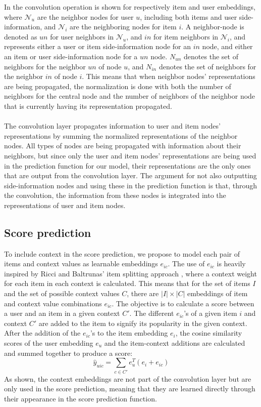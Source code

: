 In  the convolution operation is shown for respectively item and user embeddings, where $\mathcal{N}_{u}$ are the neighbor nodes for user $u$, including both items and user side-information, and $\mathcal{N}_{i}$ are the neighboring nodes for item $i$. 
A neighbor-node is denoted as $un$ for user neighbors in $\mathcal{N}_{u}$, and $in$ for item neighbors in $\mathcal{N}_{i}$, and represents either a user or item side-information node for an $in$ node, and either an item or user side-information node for a $un$ node.
$N_{un}$ denotes the set of neighbors for the neighbor $un$ of node $u$, and $N_{in}$ denotes the set of neighbors for the neighbor $in$ of node $i$.
This means that when neighbor nodes' representations are being propagated, the normalization is done with both the number of neighbors for the central node and the number of neighbors of the neighbor node that is currently having its representation propagated.
\\\\
The convolution layer propagates information to user and item nodes' representations by summing the normalized representations of the neighbor nodes.
All types of nodes are being propagated with information about their neighbors, but since only the user and item nodes' representations are being used in the prediction function for our model, their representations are the only ones that are output from the convolution layer.
The argument for not also outputting side-information nodes and using these in the prediction function is that, through the convolution, the information from these nodes is integrated into the representations of user and item nodes.

\subsection{Score prediction}\label{subsec:csgcn_is_score_prediction}
To include context in the score prediction, we propose to model each pair of items and context values as learnable embeddings $e_{ic}$.
The use of $e_{ic}$ is heavily inspired by Ricci and Baltrunas' item splitting approach \cite{baltrunasitemsplitting}, where a context weight for each item in each context is calculated.
This means that for the set of items $I$ and the set of possible context values $C$, there are $|I| \times |C|$ embeddings of item and context value combinations $e_{ic}$.
The objective is to calculate a score between a user and an item in a given context $C'$.
The different $e_{ic}$'s of a given item $i$ and context $C'$ are added to the item to signify its popularity in the given context.
After the addition of the $e_{ic}$'s to the item embedding $e_i$, the cosine similarity scores of the user embedding $e_u$ and the item-context additions are calculated and summed together to produce a score: 
\begin{equation}
  \hat{y}_{uic} = \sum_{c \in C'} e_u^T(e_i+e_{ic})
\end{equation}
As shown, the context embeddings are not part of the convolution layer but are only used in the score prediction, meaning that they are learned directly through their appearance in the score prediction function.


